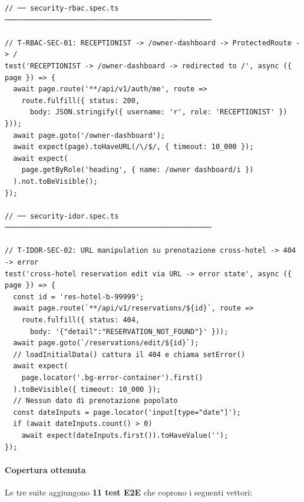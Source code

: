 ﻿\documentclass[a4paper,12pt]{report}
\begin{document}
\begin{securebox}[title={Codice Sicuro --- 11 test E2E attack-path (3 suite)}]
\begin{lstlisting}[style=typescript]
// ── security-rbac.spec.ts ─────────────────────────────────────────────────

// T-RBAC-SEC-01: RECEPTIONIST -> /owner-dashboard -> ProtectedRoute -> /
test('RECEPTIONIST -> /owner-dashboard -> redirected to /', async ({ page }) => {
  await page.route('**/api/v1/auth/me', route =>
    route.fulfill({ status: 200,
      body: JSON.stringify({ username: 'r', role: 'RECEPTIONIST' }) }));
  await page.goto('/owner-dashboard');
  await expect(page).toHaveURL(/\/$/, { timeout: 10_000 });
  await expect(
    page.getByRole('heading', { name: /owner dashboard/i })
  ).not.toBeVisible();
});

// ── security-idor.spec.ts ─────────────────────────────────────────────────

// T-IDOR-SEC-02: URL manipulation su prenotazione cross-hotel -> 404 -> error
test('cross-hotel reservation edit via URL -> error state', async ({ page }) => {
  const id = 'res-hotel-b-99999';
  await page.route(`**/api/v1/reservations/${id}`, route =>
    route.fulfill({ status: 404,
      body: '{"detail":"RESERVATION_NOT_FOUND"}' }));
  await page.goto(`/reservations/edit/${id}`);
  // loadInitialData() cattura il 404 e chiama setError()
  await expect(
    page.locator('.bg-error-container').first()
  ).toBeVisible({ timeout: 10_000 });
  // Nessun dato di prenotazione popolato
  const dateInputs = page.locator('input[type="date"]');
  if (await dateInputs.count() > 0)
    await expect(dateInputs.first()).toHaveValue('');
});
\end{lstlisting}
\end{securebox}

\paragraph{Copertura ottenuta}
Le tre suite aggiungono \textbf{11 test E2E} che coprono i seguenti vettori:
\end{document}
